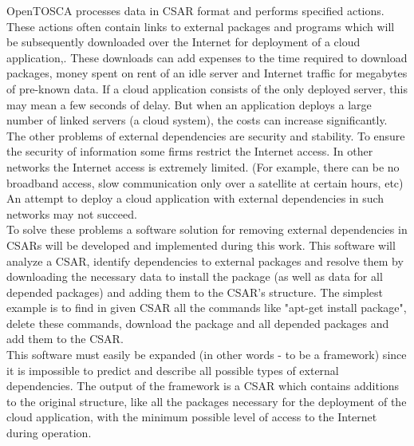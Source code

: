 OpenTOSCA processes data in CSAR format and performs specified actions. %
These actions often contain links to external packages and programs which will be subsequently downloaded over the Internet for deployment of a cloud application,.
These downloads can add expenses to the time required to download packages, money spent on rent of an idle server and Internet traffic for megabytes of pre-known data.
If a cloud application consists of the only deployed server, this may mean a few seconds of delay. 
But when an application deploys a large number of linked servers (a cloud system), the costs can increase significantly.\\
The other problems of external dependencies are security and stability.
To ensure the security of information some firms restrict the Internet access.
In other networks the Internet access is extremely limited.
(For example, there can be no broadband access, slow communication only over a satellite at certain hours, etc)
An attempt to deploy a cloud application with external dependencies in such networks may not succeed. \\
To solve these problems a software solution for removing external dependencies in CSARs will be developed and implemented during this work.
This software will analyze a CSAR, identify dependencies to external packages and resolve them by downloading the necessary data to install the package (as well as data for all depended packages) and adding them to the CSAR's structure.
The simplest example is to find in given CSAR all the commands like "apt-get install package", delete these commands, download the package and all depended packages and add them to the CSAR.\\
This software must easily be expanded (in other words - to be a framework) since it is impossible to predict and describe all possible types of external dependencies.
The output of the framework is a CSAR which contains additions to the original structure, like all the packages necessary for the deployment of the cloud application, with the minimum possible level of access to the Internet during operation.
\clearpage 
